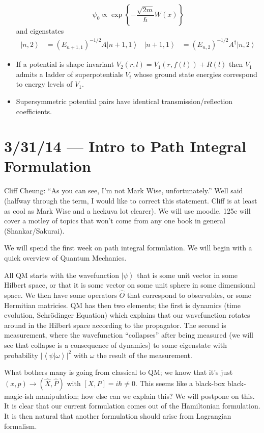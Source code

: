 \documentclass[10pt]{report}
\newcommand{\ket}[1]{\left|#1\right>}
\newcommand{\dotp}[2]{\left<#1\left.\right|#2\right>}
\newcommand{\abs}[1]{\left|#1\right|}
\begin{document}
\begin{itemize}
        $$\psi_0 \propto \exp\left\{ -\frac{\sqrt{2m}}{\hbar}W(x) \right\}$$
        and eigenstates
        \begin{align*}
            \ket{n,2} &= \left( E_{n+1,1} \right)^{-1/2}A\ket{n+1,1} & \ket{n+1,1} &= \left( E_{n,2} \right)^{-1/2}A^\dagger\ket{n,2}
        \end{align*}
    \item If a potential is shape invariant $V_2(r,l) = V_1(r, f(l)) + R(l)$ then $V_1$ admits a ladder of superpotentials $V_i$ whose ground state energies correspond to energy levels of $V_1$.
    \item Supersymmetric potential pairs have identical transmission/reflection coefficients. 
\end{itemize}

\chapter{3/31/14 --- Intro to Path Integral Formulation}

Cliff Cheung: ``As you can see, I'm not Mark Wise, unfortunately.'' Well said (halfway through the term, I would like to correct this statement. Cliff is at least as cool as Mark Wise and a heckuva lot clearer). We will use moodle. 125c will cover a motley of topics that won't come from any one book in general (Shankar/Sakurai).

We will spend the first week on path integral formulation. We will begin with a quick overview of Quantum Mechanics.

All QM starts with the wavefunction $\ket{\psi}$ that is some unit vector in some Hilbert space, or that it is some vector on some unit sphere in some dimensional space. We then have some operators $\hat{O}$ that correspond to observables, or some Hermitian matricies. QM has then two elements; the first is dynamics (time evolution, Schr\"odinger Equation) which explains that our wavefunction rotates around in the Hilbert space according to the propagator. The second is measurement, where the wavefunction ``collapses'' after being measured (we will see that collapse is a consequence of dynamics) to some eigenstate with probability $\abs{\dotp{\psi}{\omega}}^2$ with $\omega$ the result of the measurement. 

What bothers many is going from classical to QM; we know that it's just $(x,p) \to (\hat{X}, \hat{P})$ with $[X,P] = i\hbar \neq 0$. This seems like a black-box black-magic-ish manipulation; how else can we explain this? We will postpone on this. It is clear that our current formulation comes out of the Hamiltonian formulation. It is then natural that another formulation should arise from Lagrangian formalism.
\end{document}
